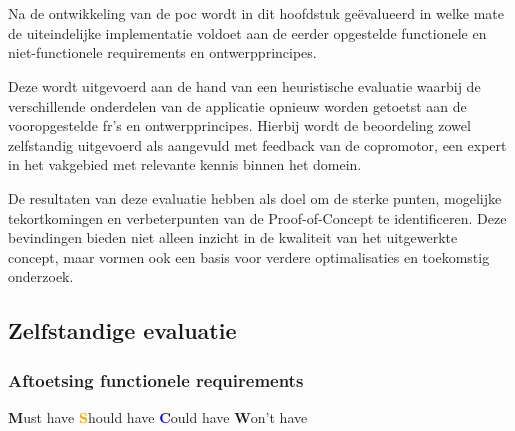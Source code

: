 
\chapter{}%
\label{ch:evaluatie}

Na de ontwikkeling van de \acrlong{poc} wordt in dit hoofdstuk geëvalueerd in welke mate de uiteindelijke implementatie voldoet aan de eerder opgestelde functionele en niet-functionele requirements en ontwerpprincipes.

\vspace{1em}

Deze wordt uitgevoerd aan de hand van een heuristische evaluatie waarbij de verschillende onderdelen van de applicatie opnieuw worden getoetst aan de vooropgestelde \acrshort{fr}'s en ontwerpprincipes. Hierbij wordt de beoordeling zowel zelfstandig uitgevoerd als aangevuld met feedback van de copromotor, een expert in het vakgebied met relevante kennis binnen het domein.

\vspace{1em}

De resultaten van deze evaluatie hebben als doel om de sterke punten, mogelijke tekortkomingen en verbeterpunten van de Proof-of-Concept te identificeren. Deze bevindingen bieden niet alleen inzicht in de kwaliteit van het uitgewerkte concept, maar vormen ook een basis voor verdere optimalisaties en toekomstig onderzoek.

\newpage

\section{Zelfstandige evaluatie}
\label{sec:zelfstandige-evaluatie}

\vspace{1em}

\subsection{Aftoetsing functionele requirements}
\label{subsec:frs-burnoutfreev2}

\vspace{1em}

{\small
    \textcolor{green!80!black}{\textbf{M}}ust have \quad
    \textcolor{orange}{\textbf{S}}hould have \quad
    \textcolor{blue}{\textbf{C}}ould have \quad
    \textcolor{black!60}{\textbf{W}}on’t have
}

